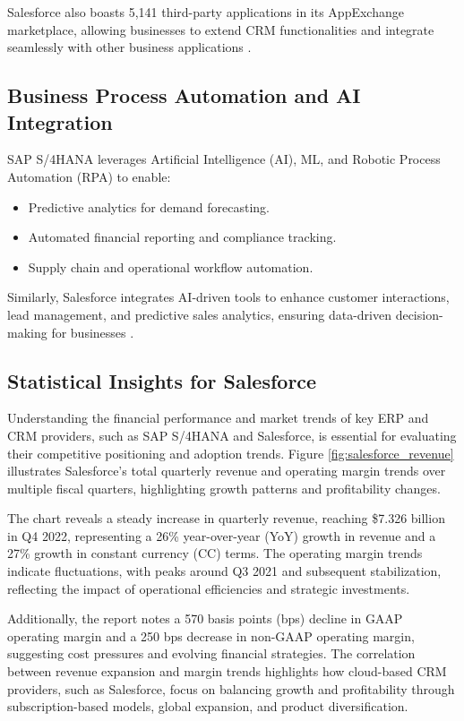 Salesforce also boasts 5,141 third-party applications in its AppExchange marketplace, allowing businesses to extend CRM functionalities and integrate seamlessly with other business applications \cite{statista_2023d}.

\subsection{Business Process Automation and AI Integration}
SAP S/4HANA leverages Artificial Intelligence (AI), ML, and Robotic Process Automation (RPA) to enable:
\begin{itemize}
    \item Predictive analytics for demand forecasting.
    \item Automated financial reporting and compliance tracking.
    \item Supply chain and operational workflow automation.
\end{itemize}

Similarly, Salesforce integrates AI-driven tools to enhance customer interactions, lead management, and predictive sales analytics, ensuring data-driven decision-making for businesses \cite{routine_2023}.

\subsection{Statistical Insights for Salesforce}

Understanding the financial performance and market trends of key ERP and CRM providers, such as SAP S/4HANA and Salesforce, is essential for evaluating their competitive positioning and adoption trends. Figure \ref{fig:salesforce_revenue} illustrates Salesforce's total quarterly revenue and operating margin trends over multiple fiscal quarters, highlighting growth patterns and profitability changes.

The chart reveals a steady increase in quarterly revenue, reaching \$7.326 billion in Q4 2022, representing a 26\% year-over-year (YoY) growth in revenue and a 27\% growth in constant currency (CC) terms. The operating margin trends indicate fluctuations, with peaks around Q3 2021 and subsequent stabilization, reflecting the impact of operational efficiencies and strategic investments.

Additionally, the report notes a 570 basis points (bps) decline in GAAP operating margin and a 250 bps decrease in non-GAAP operating margin, suggesting cost pressures and evolving financial strategies. The correlation between revenue expansion and margin trends highlights how cloud-based CRM providers, such as Salesforce, focus on balancing growth and profitability through subscription-based models, global expansion, and product diversification.

